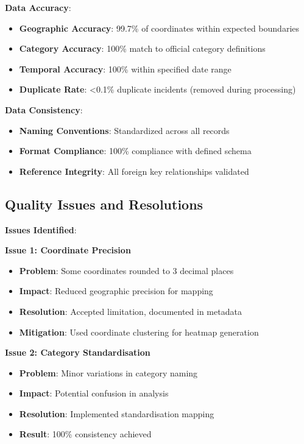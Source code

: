 \documentclass[12pt,a4paper]{article}
\begin{document}
\textbf{Data Accuracy}:
\begin{itemize}
    \item \textbf{Geographic Accuracy}: 99.7\% of coordinates within expected boundaries
    \item \textbf{Category Accuracy}: 100\% match to official category definitions
    \item \textbf{Temporal Accuracy}: 100\% within specified date range
    \item \textbf{Duplicate Rate}: <0.1\% duplicate incidents (removed during processing)
\end{itemize}

\textbf{Data Consistency}:
\begin{itemize}
    \item \textbf{Naming Conventions}: Standardized across all records
    \item \textbf{Format Compliance}: 100\% compliance with defined schema
    \item \textbf{Reference Integrity}: All foreign key relationships validated
\end{itemize}

\subsection{Quality Issues and Resolutions}

\textbf{Issues Identified}:

\textbf{Issue 1: Coordinate Precision}
\begin{itemize}
    \item \textbf{Problem}: Some coordinates rounded to 3 decimal places
    \item \textbf{Impact}: Reduced geographic precision for mapping
    \item \textbf{Resolution}: Accepted limitation, documented in metadata
    \item \textbf{Mitigation}: Used coordinate clustering for heatmap generation
\end{itemize}

\textbf{Issue 2: Category Standardisation}
\begin{itemize}
    \item \textbf{Problem}: Minor variations in category naming
    \item \textbf{Impact}: Potential confusion in analysis
    \item \textbf{Resolution}: Implemented standardisation mapping
    \item \textbf{Result}: 100\% consistency achieved
\end{itemize}
\end{document}
